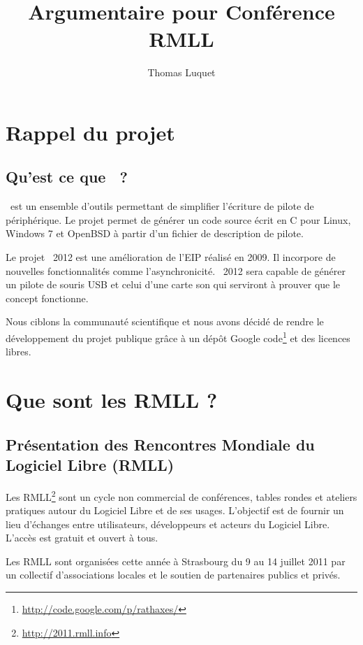 \documentclass{rtxreport}
\author{Thomas Luquet}
\title{Argumentaire pour Conférence RMLL}
\begin{document}
\maketitle

\tableofcontents

\chapter{Rappel du projet}

\section{Qu'est ce que \rtx\ ?}

\rtx\ est un ensemble d'outils permettant de simplifier l'écriture de pilote de
périphérique. Le projet permet de générer un code source écrit en C pour Linux,
Windows 7 et OpenBSD à partir d'un fichier de description de pilote.

Le projet \rtx\ 2012 est une amélioration de l'EIP réalisé en 2009. Il
incorpore de nouvelles fonctionnalités comme l’asynchronicité. \rtx\ 2012 sera
capable de générer un pilote de souris USB et celui d'une carte son qui
serviront à prouver que le concept fonctionne.

Nous ciblons la communauté scientifique et nous avons décidé de rendre le
développement du projet publique grâce à un dépôt Google
code\footnote{\url{http://code.google.com/p/rathaxes/}} et des licences libres.



\chapter{Que sont les RMLL ?}

\section{Présentation des Rencontres Mondiale du Logiciel Libre (RMLL)}

Les RMLL\footnote{\url{http://2011.rmll.info}} sont un cycle non commercial de
conférences, tables rondes et ateliers pratiques autour du Logiciel Libre et de
ses usages. L’objectif est de fournir un lieu d’échanges entre utilisateurs,
développeurs et acteurs du Logiciel Libre. L’accès est gratuit et ouvert à
tous.

Les RMLL sont organisées cette année à Strasbourg du 9 au 14 juillet 2011 par
un collectif d’associations locales et le soutien de partenaires publics et
privés.
\end{document}
